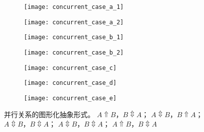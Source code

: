 \begin{figure}[htbp]
  \centering
  \begin{subfigure}{0.48\textwidth}
  	\centering
  	\begin{minipage}[b]{1\textwidth}
  	  \centering
  	  \texttt{[image: concurrent\_case\_a\_1]}
  	\end{minipage}
  	\begin{minipage}[b]{1\textwidth}
  	  \vspace{1em}
  	  \centering
  	  \texttt{[image: concurrent\_case\_a\_2]}
  	\end{minipage}
  	\caption{}
  	\label{fig:concurrent_case_a}
  \end{subfigure}
  \begin{subfigure}{0.48\textwidth}
  	\centering
  	\begin{minipage}[b]{1\textwidth}
  	  \centering
  	  \texttt{[image: concurrent\_case\_b\_1]}
  	\end{minipage}
  	\begin{minipage}[b]{1\textwidth}
  	  \vspace{1em}
  	  \centering
  	  \texttt{[image: concurrent\_case\_b\_2]}
  	\end{minipage}
  	\caption{}
  	\label{fig:concurrent_case_b}
  \end{subfigure}
  \begin{subfigure}{0.48\textwidth}
  	\vspace{1em}
  	\centering
  	\texttt{[image: concurrent\_case\_c]}
  	\caption{}
  	\label{fig:concurrent_case_c}
  \end{subfigure}
  \begin{subfigure}{0.48\textwidth}
  	\vspace{1em}
  	\centering
  	\texttt{[image: concurrent\_case\_d]}
  	\caption{}
  	\label{fig:concurrent_case_d}
  \end{subfigure}
  \begin{subfigure}{0.48\textwidth}
  	\vspace{1em}
  	\centering
  	\texttt{[image: concurrent\_case\_e]}
  	\caption{}
  	\label{fig:concurrent_case_e}
  \end{subfigure}
  \caption{并行关系的图形化抽象形式。 $A\Uparrow B$，$B\Updownarrow A$； $A\Updownarrow B$，$B\Uparrow A$； $A\Updownarrow B$，$B\Updownarrow A$； $A\Updownarrow B$，$B\Updownarrow A$； $A\Uparrow B$，$B\Updownarrow A$}
  \label{fig:concurrent_case_formulas}
\end{figure}

